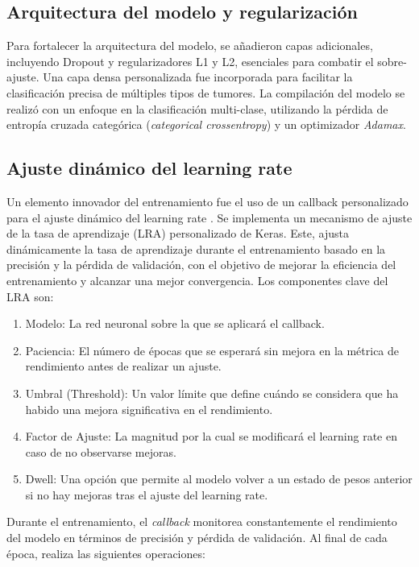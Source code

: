 \subsection{Arquitectura del modelo y regularización}

Para fortalecer la arquitectura del modelo, se añadieron capas adicionales, incluyendo Dropout y regularizadores L1 y L2, esenciales para combatir el sobre-ajuste. Una capa densa personalizada fue incorporada para facilitar la clasificación precisa de múltiples tipos de tumores. La compilación del modelo se realizó con un enfoque en la clasificación multi-clase, utilizando la pérdida de entropía cruzada categórica (\textit{categorical crossentropy}) y un optimizador \textit{Adamax}.

\subsection{Ajuste dinámico del learning rate}

Un elemento innovador del entrenamiento fue el uso de un callback personalizado para el ajuste dinámico del learning rate . Se implementa un mecanismo de ajuste de la tasa de aprendizaje (LRA) personalizado de Keras. Este, ajusta dinámicamente la tasa de aprendizaje durante el entrenamiento basado en la precisión y la pérdida de validación, con el objetivo de mejorar la eficiencia del entrenamiento y alcanzar una mejor convergencia. Los componentes clave del LRA son:

\begin{enumerate}
   \item Modelo: La red neuronal sobre la que se aplicará el callback.
   \item Paciencia: El número de épocas que se esperará sin mejora en la métrica de rendimiento antes de realizar un ajuste.
   \item Umbral (Threshold): Un valor límite que define cuándo se considera que ha habido una mejora significativa en el rendimiento.
   \item Factor de Ajuste: La magnitud por la cual se modificará el learning rate en caso de no observarse mejoras.
   \item Dwell: Una opción que permite al modelo volver a un estado de pesos anterior si no hay mejoras tras el ajuste del learning rate.
\end{enumerate}

Durante el entrenamiento, el \textit{callback} monitorea constantemente el rendimiento del modelo en términos de precisión y pérdida de validación. Al final de cada época, realiza las siguientes operaciones:

